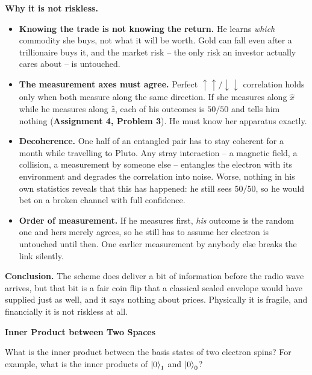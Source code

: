 \documentclass[a4paper, 10pt]{article}
\begin{document}
\begin{solution}
	\noindent \textbf{Why it is not riskless.}
	\begin{itemize}
		\item \textbf{Knowing the trade is not knowing the return.} He learns \emph{which} commodity she buys, not what it will be worth. Gold can fall even after a trillionaire buys it, and the market risk -- the only risk an investor actually cares about -- is untouched.
		\item \textbf{The measurement axes must agree.} Perfect \( \uparrow\uparrow / \downarrow\downarrow \) correlation holds only when both measure along the same direction. If she measures along \( \hat{x} \) while he measures along \( \hat{z} \), each of his outcomes is \( 50/50 \) and tells him nothing (\textbf{Assignment 4, Problem 3}). He must know her apparatus exactly.
		\item \textbf{Decoherence.} One half of an entangled pair has to stay coherent for a month while travelling to Pluto. Any stray interaction -- a magnetic field, a collision, a measurement by someone else -- entangles the electron with its environment and degrades the correlation into noise. Worse, nothing in his own statistics reveals that this has happened: he still sees \( 50/50 \), so he would bet on a broken channel with full confidence.
		\item \textbf{Order of measurement.} If he measures first, \emph{his} outcome is the random one and hers merely agrees, so he still has to assume her electron is untouched until then. One earlier measurement by anybody else breaks the link silently.
	\end{itemize}

	\noindent \textbf{Conclusion.} The scheme does deliver a bit of information before the radio wave arrives, but that bit is a fair coin flip that a classical sealed envelope would have supplied just as well, and it says nothing about prices.
	Physically it is fragile, and financially it is not riskless at all.
\end{solution}

\begin{problem}
\textbf{Inner Product between Two Spaces}
\par What is the inner product between the basis states of two electron spins?
For example, what is the inner products of \( \ket{0}_1 \) and \( \ket{0}_0 \)?
\end{problem}
\end{document}
